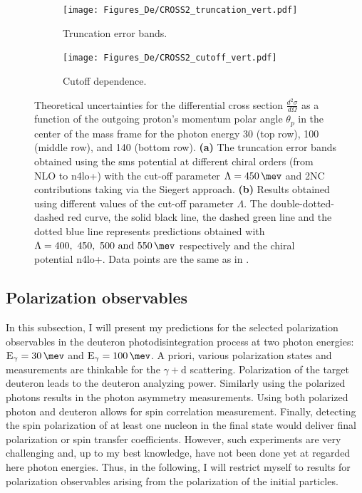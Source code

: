         
    \begin{figure}[h]
        \centering
        \begin{subfigure}[t]{0.46\textwidth}
            \caption{Truncation error bands.}
            \texttt{[image: Figures\_De/CROSS2\_truncation\_vert.pdf]}
            \label{Diff_cross_truncation}
        \end{subfigure}
        \begin{subfigure}[t]{0.46\textwidth}
            \caption{Cutoff dependence.}
            \texttt{[image: Figures\_De/CROSS2\_cutoff\_vert.pdf]}
            \label{Diff_cross_cutoff}
        \end{subfigure}
        \caption{Theoretical uncertainties 
        for the differential cross section $\frac{d^2\sigma}{d\Omega}$
        as a function of the outgoing proton's momentum polar angle $\theta_p$ in the center of the mass frame 
        for the photon energy \SI{30}{\mev} (top row), \SI{100}{\mev} (middle row), and \SI{140}{\mev} (bottom row).
        {\bf(a)} The truncation error bands obtained using the \gls{sms} potential
        at different chiral orders (from NLO to \gls{n4lo+}) 
        with the cut-off parameter $\Lambda=\SI{450}{\mev}$ and 2NC contributions taking via the Siegert approach.
        {\bf (b)} Results obtained using different values of the cut-off parameter $\Lambda$.
        The double-dotted-dashed red curve, the solid black line, the dashed green line
        and the dotted blue line represents predictions obtained 
        with $\Lambda=\SIlist[list-units = single]{400;450;500;550}{\mev}$ respectively
        and the chiral potential \gls{n4lo+}. 
        Data points are the same as in .}
        \label{Diff_cross_err}
    \end{figure}

    \clearpage

    \subsection{Polarization observables}
    \label{sec:polarization_results}

    In this subsection, I will present my predictions for the 
    selected polarization observables in the deuteron photodisintegration process
    at two photon energies: $\text{E}_\gamma = \SI{30}{\mev}$ and
    $\text{E}_\gamma = \SI{100}{\mev}$.
    A priori, various polarization states and measurements
    are thinkable for the $\gamma + \text{d}$ scattering.
    Polarization of the target deuteron leads to the deuteron
    analyzing power.
    Similarly using the polarized photons results in the photon asymmetry measurements.
    Using both polarized photon and deuteron allows for spin
    correlation measurement.
    Finally, detecting the spin polarization of at least one nucleon in the final state would deliver
    final polarization or spin transfer coefficients. 
    However, such experiments are very challenging and, up to my best knowledge,
    have not been done yet at regarded here photon energies.
    Thus, in the following, I will restrict myself to results for polarization
    observables arising from the polarization of the initial particles.

